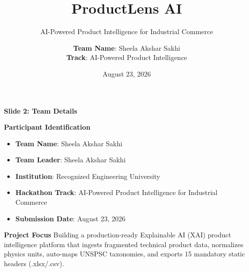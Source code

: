 \documentclass[aspectratio=169, 10pt]{beamer}
\title[\textbf{ProductLens AI}]{\Huge \textbf{ProductLens AI}}
\subtitle{\Large AI-Powered Product Intelligence for Industrial Commerce}
\author[\textbf{Team Sheela Akshar Sakhi}]{\textbf{Team Name}: Sheela Akshar Sakhi \\ \textbf{Track}: AI-Powered Product Intelligence}
\institute[UniHack 2026]{\textbf{UniHack 2026} --- Powered by \textbf{Unilog} \& \textbf{Hack2skill}}
\date{August 23, 2026}
\begin{document}
\begin{frame}[plain]
  \titlepage
\end{frame}

\begin{frame}{\textbf{Slide 2: Team Details}}
  \begin{block}{\textbf{Participant Identification}}
    \begin{itemize}
      \item \textbf{Team Name}: Sheela Akshar Sakhi
      \item \textbf{Team Leader}: Sheela Akshar Sakhi
      \item \textbf{Institution}: Recognized Engineering University
      \item \textbf{Hackathon Track}: AI-Powered Product Intelligence for Industrial Commerce
      \item \textbf{Submission Date}: August 23, 2026
    \end{itemize}
  \end{block}
  \vspace{0.3cm}
  \begin{alertblock}{\textbf{Project Focus}}
    Building a production-ready Explainable AI (XAI) product intelligence platform that ingests fragmented technical product data, normalizes physics units, auto-maps UNSPSC taxonomies, and exports 15 mandatory static headers (.xlsx/.csv).
  \end{alertblock}
\end{frame}
\end{document}
